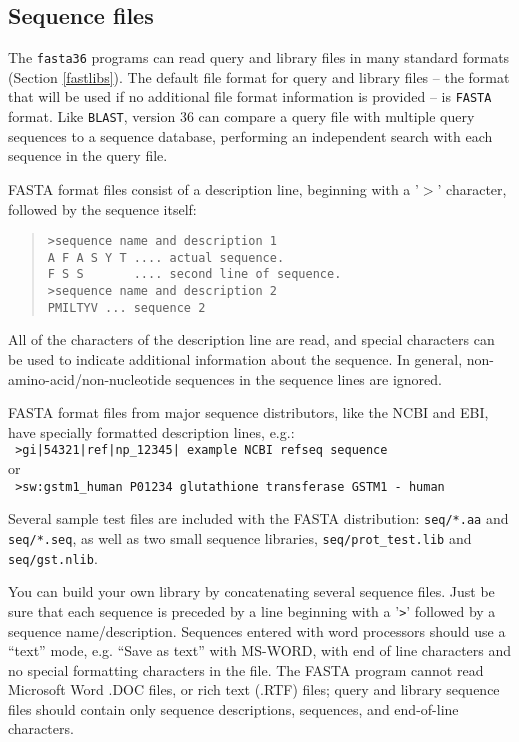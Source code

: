 \documentclass[11pt]{article}
\begin{document}
\subsection{Sequence files}

The \texttt{fasta36} programs can read query and library files in many
standard formats (Section \ref{fastlibs}). The default file format for query and library files
-- the format that will be used if no additional file format
information is provided -- is \texttt{FASTA} format. Like
\texttt{BLAST}, version 36 can compare a query file with multiple
query sequences to a sequence database, performing an independent
search with each sequence in the query file.

FASTA format files consist of a description line, beginning
with a '$>$' character, followed by the sequence itself:
\begin{quote}
\begin{verbatim}
>sequence name and description 1
A F A S Y T .... actual sequence.
F S S       .... second line of sequence.
>sequence name and description 2
PMILTYV ... sequence 2
\end{verbatim}
\end{quote}
All of the characters of the description line are read, and special
characters can be used to indicate additional information about the
sequence. In general, non-amino-acid/non-nucleotide sequences in the
sequence lines are ignored.

FASTA format files from major sequence distributors, like the NCBI and
EBI, have specially formatted description lines, e.g.:\\
\indent
\texttt{
>gi|54321|ref|np\_12345| example NCBI refseq sequence\\
}
or\\
\indent
\texttt{
>sw:gstm1\_human P01234 glutathione transferase GSTM1 - human\\
}

Several sample test files are included with the FASTA distribution:
\texttt{seq/*.aa} and \texttt{seq/*.seq}, as well as two small sequence
libraries, \texttt{seq/prot\_test.lib} and \texttt{seq/gst.nlib}.

You can build your own library by concatenating several sequence
files.  Just be sure that each sequence is preceded by a line
beginning with a '\texttt{>}' followed by a sequence name/description.  Sequences
entered with word processors should use a ``text'' mode, e.g. ``Save as
text'' with MS-WORD, with end of line characters and no special
formatting characters in the file.  The FASTA program cannot read
Microsoft Word .DOC files, or rich text (.RTF) files; query and
library sequence files should contain only sequence descriptions,
sequences, and end-of-line characters.
\end{document}
